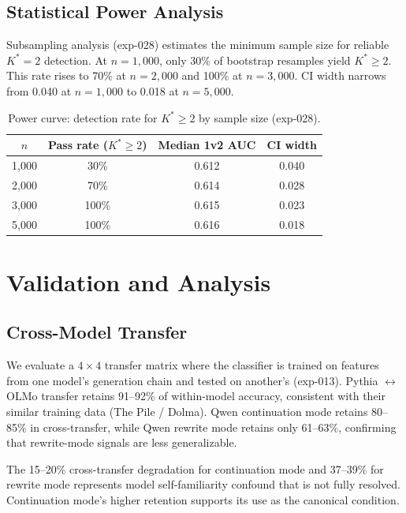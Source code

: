 \documentclass[11pt,a4paper]{article}
\begin{document}
\subsection{Statistical Power Analysis}

Subsampling analysis (exp-028) estimates the minimum sample size for reliable $K^* = 2$ detection. At $n = 1{,}000$, only 30\% of bootstrap resamples yield $K^* \geq 2$. This rate rises to 70\% at $n = 2{,}000$ and 100\% at $n = 3{,}000$. CI width narrows from 0.040 at $n = 1{,}000$ to 0.018 at $n = 5{,}000$.

\begin{table}[t]
\centering
\caption{Power curve: detection rate for $K^* \geq 2$ by sample size (exp-028).}
\label{tab:power}
\small
\begin{tabular}{cccc}
\toprule
$n$ & Pass rate ($K^* \geq 2$) & Median 1v2 AUC & CI width \\
\midrule
1{,}000 & 30\% & 0.612 & 0.040 \\
2{,}000 & 70\% & 0.614 & 0.028 \\
3{,}000 & 100\% & 0.615 & 0.023 \\
5{,}000 & 100\% & 0.616 & 0.018 \\
\bottomrule
\end{tabular}
\end{table}

\section{Validation and Analysis}

\subsection{Cross-Model Transfer}
\label{sec:transfer}

We evaluate a $4 \times 4$ transfer matrix where the classifier is trained on features from one model's generation chain and tested on another's (exp-013). Pythia $\leftrightarrow$ OLMo transfer retains 91--92\% of within-model accuracy, consistent with their similar training data (The Pile / Dolma). Qwen continuation mode retains 80--85\% in cross-transfer, while Qwen rewrite mode retains only 61--63\%, confirming that rewrite-mode signals are less generalizable.

The 15--20\% cross-transfer degradation for continuation mode and 37--39\% for rewrite mode represents model self-familiarity confound that is not fully resolved. Continuation mode's higher retention supports its use as the canonical condition.
\end{document}
